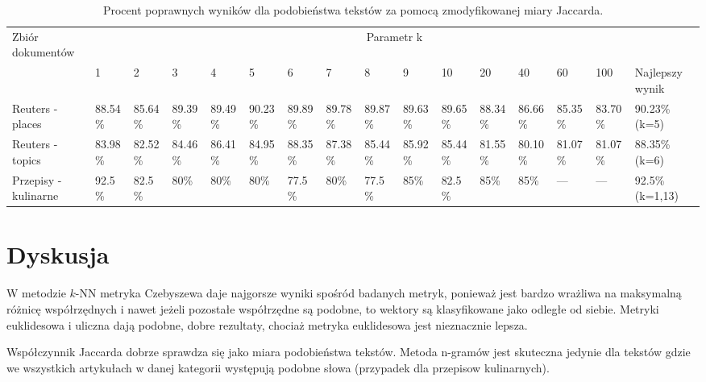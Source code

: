 \documentclass{classrep}
\begin{document}
\begingroup
{\scriptsize  
\setlength{\LTleft}{-20cm plus -1fill}
\setlength{\LTright}{\LTleft}

\begin{longtable}{|p{1cm}|p{0.7cm}|p{0.7cm}|p{0.7cm}|p{0.7cm}|p{0.7cm}|p{0.7cm}|p{0.7cm}|p{0.7cm}|p{0.7cm}|p{0.7cm}|p{0.7cm}|p{0.7cm}|p{0.7cm}|p{0.7cm}|p{1.1cm}|}
\caption{ Procent poprawnych wyników dla podobieństwa tekstów za pomocą zmodyfikowanej miary Jaccarda.}\\ 
\hline

Zbiór
dokumentów

 &\multicolumn{15}{c|}{Parametr k}\\
\cline{2-16}
& 1
& 2
& 3
& 4
& 5
& 6
& 7
& 8
& 9
& 10
& 20
& 40
& 60
& 100
& Najlepszy wynik
\\ \hline\hline
Reuters
- places
& 88.54\%	%
& 85.64\%	%
& 89.39\%	%
& 89.49\%	%
& 90.23\%	%
& 89.89\%	%
& 89.78\%	%
& 89.87\%	%
& 89.63\%	%
& 89.65\%	%
& 88.34\%	%
& 86.66\%	%
& 85.35\%	%
& 83.70\%	%

& 90.23\%	(k=5)
\\ \hline
Reuters
- topics
& 83.98\%	%
& 82.52\%	%
& 84.46\%	%
& 86.41\%	%
& 84.95\%	%
& 88.35\%	%
& 87.38\%	%
& 85.44\%	%
& 85.92\%	%
& 85.44\%	%
& 81.55\%	%
& 80.10\%	%
& 81.07\%	%
& 81.07\%	%

& 88.35\%	(k=6)
\\ \hline
Przepisy
- kulinarne 
& 92.5\%	%
& 82.5\%	%
& 80\%		%
& 80\%		%
& 80\%		%
& 77.5\%	%
& 80\%		%
& 77.5\%	%
& 85\%		%
& 82.5\%	%
& 85\%		%
& 85\%		%
& ---		%
& ---		%
& 92.5\% (k=1,13)
\\ \hline
\end{longtable}
}
\endgroup



\section{Dyskusja}
W metodzie $k$-NN metryka Czebyszewa daje najgorsze wyniki spośród badanych metryk, ponieważ jest bardzo wrażliwa na maksymalną różnicę współrzędnych i nawet jeżeli pozostałe współrzędne są podobne, to wektory są klasyfikowane jako odległe od siebie. Metryki euklidesowa i uliczna dają podobne, dobre rezultaty, chociaż metryka euklidesowa jest nieznacznie lepsza.

Współczynnik Jaccarda dobrze sprawdza się jako miara podobieństwa tekstów. Metoda n-gramów jest skuteczna jedynie dla tekstów gdzie we wszystkich artykułach w danej kategorii występują podobne słowa (przypadek dla przepisow kulinarnych).
\end{document}
